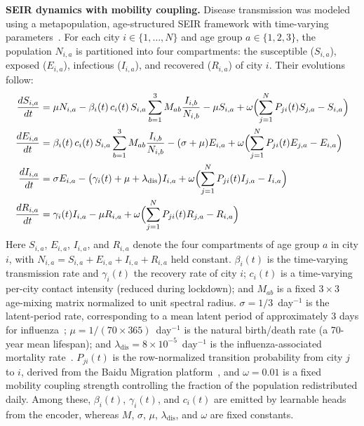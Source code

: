 \documentclass[10pt,letterpaper]{article}
\begin{document}
	\noindent\textbf{SEIR dynamics with mobility coupling.}
	Disease transmission was modeled using a metapopulation, age-structured SEIR framework with
	time-varying parameters~\cite{kermack1927,colizza2008,citron2021}. For each
	city $i \in \{1,\dots,N\}$ and age group $a\in\{1,2,3\}$, the population $N_{i,a}$ is partitioned into four compartments: the susceptible ($S_{i,a}$), exposed ($E_{i,a}$), infectious ($I_{i,a}$), and recovered ($R_{i,a}$) of city $i$. Their evolutions follow:
	\begin{align}
		\frac{dS_{i,a}}{dt}
		&= \mu N_{i,a}
		-\beta_i(t)\,c_i(t)\,S_{i,a}\sum_{b=1}^{3}M_{ab}\frac{I_{i,b}}{N_{i,b}}
		-\mu S_{i,a}
		+\omega\Bigl(\sum_{j=1}^{N} P_{ji}(t) S_{j,a} - S_{i,a}\Bigr)
		\label{eq:metapop_s}
		\\
		\frac{dE_{i,a}}{dt}
		&= \beta_i(t)\,c_i(t)\,S_{i,a}\sum_{b=1}^{3}M_{ab}\frac{I_{i,b}}{N_{i,b}}
		-(\sigma+\mu)E_{i,a}
		+\omega\Bigl(\sum_{j=1}^{N} P_{ji}(t) E_{j,a} - E_{i,a}\Bigr)
		\label{eq:metapop_e}
		\\
		\frac{dI_{i,a}}{dt}
		&= \sigma E_{i,a}
		-\bigl(\gamma_i(t)+\mu+\lambda_{\mathrm{dis}}\bigr)I_{i,a}
		+\omega\Bigl(\sum_{j=1}^{N} P_{ji}(t) I_{j,a} - I_{i,a}\Bigr)
		\label{eq:metapop_i}
		\\
		\frac{dR_{i,a}}{dt}
		&= \gamma_i(t)I_{i,a}
		-\mu R_{i,a}
		+\omega\Bigl(\sum_{j=1}^{N} P_{ji}(t) R_{j,a} - R_{i,a}\Bigr)
		\label{eq:metapop_r}
	\end{align}
	\noindent Here $S_{i,a}$, $E_{i,a}$, $I_{i,a}$, and $R_{i,a}$ denote the four compartments of age group $a$ in city $i$, with $N_{i,a}=S_{i,a}+E_{i,a}+I_{i,a}+R_{i,a}$ held constant. $\beta_i(t)$ is the time-varying transmission rate and $\gamma_i(t)$ the recovery rate of city $i$; $c_i(t)$ is a time-varying per-city contact intensity (reduced during lockdown); and $M_{ab}$ is a fixed $3\times3$ age-mixing matrix normalized to unit spectral radius. $\sigma=1/3$~day$^{-1}$ is the latent-period rate, corresponding to a mean latent period of approximately 3 days for influenza~\cite{lessler2009}; $\mu=1/(70\times365)$~day$^{-1}$ is the natural birth/death rate (a 70-year mean lifespan); and $\lambda_{\mathrm{dis}}=8\times10^{-5}$~day$^{-1}$ is the influenza-associated mortality rate~\cite{iuliano2018}. $P_{ji}(t)$ is the row-normalized transition probability from city $j$ to $i$, derived from the Baidu Migration platform~\cite{baidu2020}, and $\omega=0.01$ is a fixed mobility coupling strength controlling the fraction of the population redistributed daily. Among these, $\beta_i(t)$, $\gamma_i(t)$, and $c_i(t)$ are emitted by learnable heads from the encoder, whereas $M$, $\sigma$, $\mu$, $\lambda_{\mathrm{dis}}$, and $\omega$ are fixed constants.
	
\end{document}
